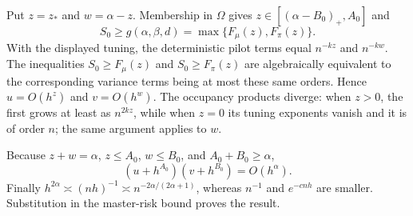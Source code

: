 Put \(z=z_*\) and \(w=\alpha-z\). Membership in \(\Omega\) gives \(z\in[(\alpha-B_0)_+,A_0]\) and
\[
S_0\ge g(\alpha,\beta,d)=\max\{F_\mu(z),F_\pi(z)\}.
\]
With the displayed tuning, the deterministic pilot terms equal \(n^{-kz}\) and \(n^{-kw}\). The inequalities \(S_0\ge F_\mu(z)\) and \(S_0\ge F_\pi(z)\) are algebraically equivalent to the corresponding variance terms being at most these same orders. Hence \(u=O(h^z)\) and \(v=O(h^w)\). The occupancy products diverge: when \(z>0\), the first grows at least as \(n^{2kz}\), while when \(z=0\) its tuning exponents vanish and it is of order \(n\); the same argument applies to \(w\).

Because \(z+w=\alpha\), \(z\le A_0\), \(w\le B_0\), and \(A_0+B_0\ge\alpha\),
\[
(u+h^{A_0})(v+h^{B_0})=O(h^\alpha).
\]
Finally \(h^{2\alpha}\asymp(nh)^{-1}\asymp n^{-2\alpha/(2\alpha+1)}\), whereas \(n^{-1}\) and \(e^{-cnh}\) are smaller. Substitution in the master-risk bound proves the result.